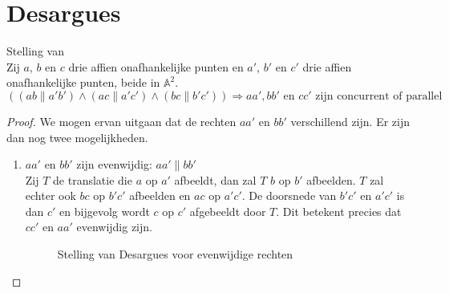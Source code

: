\documentclass[main.tex]{subfiles}
\begin{document}
\section{Desargues}
\label{sec:desargues}

\begin{st}
  Stelling van \\
  Zij $a$, $b$ en $c$ drie affien onafhankelijke punten en $a'$, $b'$ en $c'$ drie affien onafhankelijke punten, beide in $\mathbb{A}^{2}$.
  \[  ((ab \parallel a'b') \wedge (ac \parallel a'c') \wedge (bc \parallel b'c')) \Rightarrow aa', bb' \text{ en } cc' \text{ zijn concurrent of parallel }\]
  
  \begin{proof}
    We mogen ervan uitgaan dat de rechten $aa'$ en $bb'$ verschillend zijn.
    Er zijn dan nog twee mogelijkheden.
    \begin{enumerate}
    \item $aa'$ en $bb'$ zijn evenwijdig: $aa' \parallel bb'$\\
      Zij $T$ de translatie die $a$ op $a'$ afbeeldt, dan zal $T$ $b$ op $b'$ afbeelden.
      $T$ zal echter ook $bc$ op $b'c'$ afbeelden en $ac$ op $a'c'$.
      De doorsnede van $b'c'$ en $a'c'$ is dan $c'$ en bijgevolg wordt $c$ op $c'$ afgebeeldt door $T$.
      Dit betekent precies dat $cc'$ en $aa'$ evenwijdig zijn.
      \begin{figure}[H]
        \centering
        \caption{Stelling van Desargues  voor evenwijdige rechten}
        \label{fig:stelling-van-desargues}
      \end{figure}


\end{enumerate}
\end{proof}
\end{st}
\end{document}
